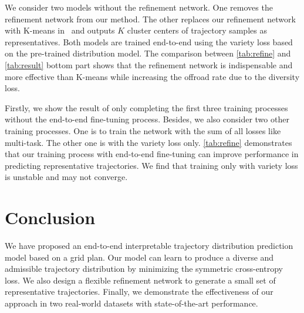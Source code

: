 \documentclass[10pt,twocolumn,letterpaper]{article}
\begin{document}
We consider two models without the refinement network. One removes the refinement network from our method. The other replaces our refinement network with K-means in~\cite{deo2020trajectory} and outputs $K$ cluster centers of trajectory samples as representatives. Both models are trained end-to-end using the variety loss based on the pre-trained distribution model. The comparison between \cref{tab:refine} and \cref{tab:result} bottom part shows that the refinement network is indispensable and more effective than K-means while increasing the offroad rate due to the diversity loss.

 Firstly, we show the result of only completing the first three training processes without the end-to-end fine-tuning process. Besides, we also consider two other training processes. One is to train the network with the sum of all losses like multi-task. The other one is with the variety loss only. \cref{tab:refine} demonstrates that our training process with end-to-end fine-tuning can improve performance in predicting representative trajectories. We find that training only with variety loss is unstable and may not converge. 


\section{Conclusion}
\label{sec:conclusion}

We have proposed an end-to-end interpretable trajectory distribution prediction model based on a grid plan. Our model can learn to produce a diverse and admissible trajectory distribution by minimizing the symmetric cross-entropy loss. We also design a flexible refinement network to generate a small set of representative trajectories. Finally, we demonstrate the effectiveness of our approach in two real-world datasets with state-of-the-art performance.



















\clearpage
{\small


}
\end{document}
